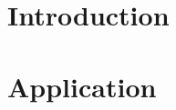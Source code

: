 \documentclass{report}
\begin{document}
\sffamily



\tableofcontents

\newpage

\chapter{Introduction} \label{introduction}


\newpage

\chapter{Application} \label{application}


\newpage

\printbibliography
\end{document}
